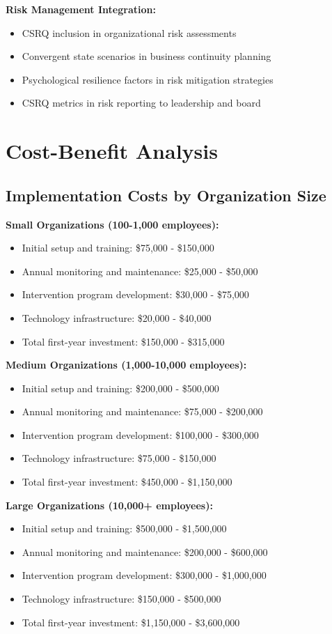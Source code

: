\documentclass[11pt,a4paper]{article}
\begin{document}
\textbf{Risk Management Integration:}
\begin{itemize}
\item CSRQ inclusion in organizational risk assessments
\item Convergent state scenarios in business continuity planning
\item Psychological resilience factors in risk mitigation strategies
\item CSRQ metrics in risk reporting to leadership and board
\end{itemize}

\section{Cost-Benefit Analysis}

\subsection{Implementation Costs by Organization Size}

\textbf{Small Organizations (100-1,000 employees):}
\begin{itemize}
\item Initial setup and training: \$75,000 - \$150,000
\item Annual monitoring and maintenance: \$25,000 - \$50,000
\item Intervention program development: \$30,000 - \$75,000
\item Technology infrastructure: \$20,000 - \$40,000
\item Total first-year investment: \$150,000 - \$315,000
\end{itemize}

\textbf{Medium Organizations (1,000-10,000 employees):}
\begin{itemize}
\item Initial setup and training: \$200,000 - \$500,000
\item Annual monitoring and maintenance: \$75,000 - \$200,000
\item Intervention program development: \$100,000 - \$300,000
\item Technology infrastructure: \$75,000 - \$150,000
\item Total first-year investment: \$450,000 - \$1,150,000
\end{itemize}

\textbf{Large Organizations (10,000+ employees):}
\begin{itemize}
\item Initial setup and training: \$500,000 - \$1,500,000
\item Annual monitoring and maintenance: \$200,000 - \$600,000
\item Intervention program development: \$300,000 - \$1,000,000
\item Technology infrastructure: \$150,000 - \$500,000
\item Total first-year investment: \$1,150,000 - \$3,600,000
\end{itemize}
\end{document}
